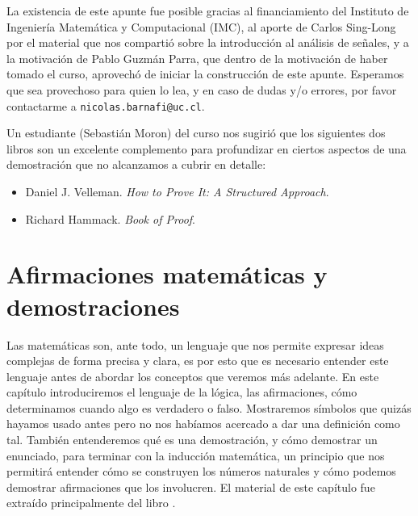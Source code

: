 \documentclass[12pt]{book}
\begin{document}
La existencia de este apunte fue posible gracias al financiamiento del Instituto de Ingeniería Matemática y Computacional (IMC), al aporte de Carlos Sing-Long por el material que nos compartió sobre la introducción al análisis de señales, y a la motivación de Pablo Guzmán Parra, que dentro de la motivación de haber tomado el curso, aprovechó de iniciar la construcción de este apunte. Esperamos que sea provechoso para quien lo lea, y en caso de dudas y/o errores, por favor contactarme a \texttt{nicolas.barnafi@uc.cl}.

Un estudiante (Sebastián Moron) del curso nos sugirió que los siguientes dos libros son un excelente complemento para profundizar en ciertos aspectos de una demostración que no alcanzamos a cubrir en detalle: 

\begin{itemize}
    \item Daniel J. Velleman. \emph{How to Prove It: A Structured Approach}.
    \item Richard Hammack. \emph{Book of Proof}.
\end{itemize}

\chapter{Afirmaciones matemáticas y demostraciones}
\noindent
Las matemáticas son, ante todo, un lenguaje que nos permite expresar ideas complejas de forma precisa y clara, es por esto que es necesario entender este lenguaje antes de abordar los conceptos que veremos más adelante. En este capítulo introduciremos el lenguaje de la lógica, las afirmaciones, cómo determinamos cuando algo es verdadero o falso. Mostraremos símbolos que quizás hayamos usado antes pero no nos habíamos acercado a dar una definición como tal. También entenderemos qué es una demostración, y cómo demostrar un enunciado, para terminar con la inducción matemática, un principio que nos permitirá entender cómo se construyen los números naturales y cómo podemos demostrar afirmaciones que los involucren.  El material de este capítulo fue extraído principalmente del libro \cite{eccles2013introduction}.

\end{document}
